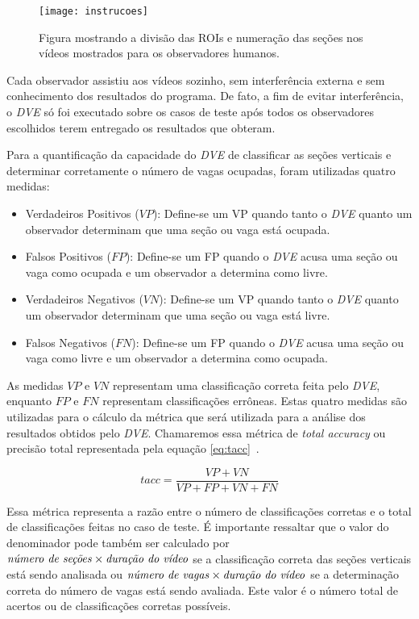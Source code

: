 \begin{figure}
\centering
\texttt{[image: instrucoes]}
\centering
\caption{Figura mostrando a divisão das ROIs e numeração das seções nos vídeos mostrados para os observadores humanos.}
\label{fig:instrucao}
\end{figure}

Cada observador assistiu aos vídeos sozinho, sem interferência externa e sem conhecimento dos resultados do programa. De fato, a fim de evitar interferência, o \textit{DVE} só foi executado sobre os casos de teste após todos os observadores escolhidos terem entregado os resultados que obteram.

Para a quantificação da capacidade do \textit{DVE} de classificar as seções verticais e determinar corretamente o número de vagas ocupadas, foram utilizadas quatro medidas:

\begin{itemize}
\item Verdadeiros Positivos ($VP$): Define-se um VP quando tanto o \textit{DVE} quanto um observador determinam que uma seção ou vaga está ocupada.
\item Falsos Positivos ($FP$): Define-se um FP quando o \textit{DVE} acusa uma seção ou vaga como ocupada e um observador a determina como livre.
\item Verdadeiros Negativos ($VN$): Define-se um VP quando tanto o \textit{DVE} quanto um observador determinam que uma seção ou vaga está livre.
\item Falsos Negativos ($FN$): Define-se um FP quando o \textit{DVE} acusa uma seção ou vaga como livre e um observador a determina como ocupada.

\end{itemize}

As medidas $VP$ e $VN$ representam uma classificação correta feita pelo \textit{DVE}, enquanto $FP$ e $FN$ representam classificações errôneas. Estas quatro medidas são utilizadas para o cálculo da métrica que será utilizada para a análise dos resultados obtidos pelo \textit{DVE}. Chamaremos essa métrica de \textit{total accuracy} ou precisão total representada pela equação \ref{eq:tacc}~\cite{zaghetto2016detecccao}.

\begin{equation}
tacc = \frac{VP + VN}{VP + FP + VN + FN}
\label{eq:tacc}
\end{equation}

Essa métrica representa a razão entre o número de classificações corretas e o total de classificações feitas no caso de teste. É importante ressaltar que o valor do denominador pode também ser calculado por $\text{\textit{número de seções}}\times \text{\textit{duração do vídeo}}$ se a classificação correta das seções verticais está sendo analisada ou $\text{\textit{número de vagas}}\times \text{\textit{duração do vídeo}}$ se a determinação correta do número de vagas está sendo avaliada. Este valor é o número total de acertos ou de classificações corretas possíveis.

